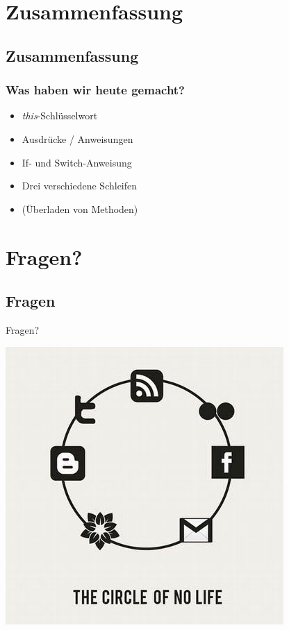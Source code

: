 \documentclass[18pt]{beamer}
\begin{document}
\section{Zusammenfassung}
\subsection{Zusammenfassung} %
\begin{frame}
	\frametitle{Was haben wir heute gemacht?}
	
	\begin{itemize}
		\item \emph{this}-Schlüsselwort
		\item Ausdrücke / Anweisungen
		\item If- und Switch-Anweisung
		\item Drei verschiedene Schleifen
		\item (Überladen von Methoden)
	\end{itemize}
\end{frame}

\section{Fragen?}
\subsection*{Fragen} %
\begin{frame}	
	\begin{center}
		\huge{Fragen?}
	\end{center}
\end{frame}



\begin{frame}[full]
\includegraphics[scale=0.55]{bilder/comics/September-25-2011-18-44-59-aa71ce1bd67502c27bc56a6b8d724897.jpeg}
\end{frame}
\end{document}
